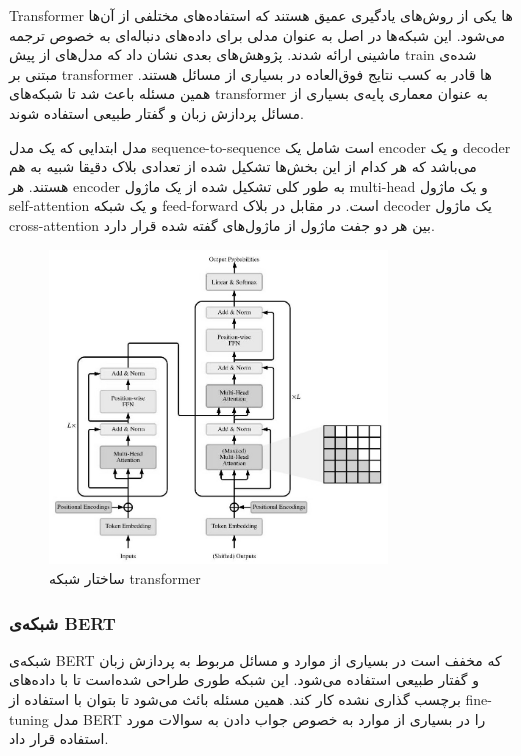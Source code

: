 \documentclass[12pt, a4paper, oneside]{report}
\begin{document}
Transformer
ها یکی از روش‌های یادگیری عمیق
هستند که استفاده‌های مختلفی از آن‌ها می‌شود. این شبکه‌ها در اصل به عنوان مدلی برای داده‌های دنباله‌ای به خصوص
ترجمه ماشینی ارائه شدند. پژوهش‌های بعدی نشان داد که مدل‌های از پیش
train
شده‌ی مبتنی بر
transformer
ها قادر به کسب نتایج فوق‌العاده در بسیاری از مسائل هستند. همین مسئله باعث شد تا شبکه‌های
transformer
به عنوان معماری پایه‌ی بسیاری از مسائل پردازش زبان و گفتار طبیعی استفاده شوند.

مدل ابتدایی که یک مدل
sequence-to-sequence
است شامل یک
encoder
و یک
decoder
می‌باشد که هر کدام از این بخش‌ها تشکیل شده از تعدادی بلاک دقیقا شبیه به هم هستند. هر
encoder
به طور کلی تشکیل شده از یک ماژول
multi-head
و یک ماژول
self-attention
و یک شبکه 
feed-forward
است. در مقابل در بلاک
decoder
یک ماژول
cross-attention
بین هر دو جفت ماژول از ماژول‌های گفته شده قرار دارد.\cite{lin2021survey}

\begin{figure}[!ht]
    \centering
    \includegraphics[width=0.8\textwidth]{transformer}
    \caption{ ساختار شبکه transformer }
    \label{fig:transformer}
\end{figure}

\subsubsection{شبکه‌ی BERT}

شبکه‌ی
BERT
که مخفف
است در بسیاری از موارد و مسائل مربوط به پردازش زبان و گفتار طبیعی استفاده می‌شود.
این شبکه طوری طراحی شده‌است تا با داده‌های برچسب گذاری نشده کار کند. همین مسئله بائث می‌شود تا بتوان با استفاده از
fine-tuning
مدل
BERT
را در بسیاری از موارد به خصوص جواب دادن به سوالات مورد استفاده قرار داد. 
\end{document}
